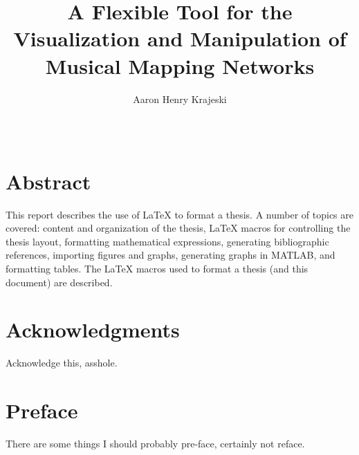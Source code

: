 \documentclass [12pt,letterpaper]{report}
\begin{document}

\title{A Flexible Tool for the Visualization and Manipulation of Musical Mapping Networks}
\author{Aaron Henry Krajeski}
\date{\Month\ \number\year}

\maketitle

\raggedbottom
\onehalfspacing
{}

\section*{\centering Abstract}

This report describes the use of \LaTeX{} to format a thesis.
A number of topics are covered: content and organization of the thesis,
 \LaTeX{} macros for controlling the thesis layout, formatting mathematical
 expressions, generating bibliographic references, importing figures and
 graphs, generating graphs in {\small MATLAB}, and formatting tables.
The \LaTeX{} macros used to format a thesis (and this document) are
 described.

\newpage

\section*{\centering Acknowledgments}
Acknowledge this, asshole.
\pagebreak

\section*{Preface}

There are some things I should probably pre-face, certainly not reface.
\pagebreak
\end{document}
